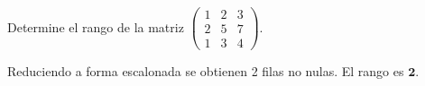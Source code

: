 \documentclass{emate-ucr}
\begin{document}
\begin{ejercicio}[10]
  Determine el rango de la matriz
  $\begin{pmatrix} 1 & 2 & 3 \\ 2 & 5 & 7 \\ 1 & 3 & 4 \end{pmatrix}$.

  \begin{solucion}
    Reduciendo a forma escalonada se obtienen 2 filas no nulas.
    El rango es $\mathbf{2}$.
  \end{solucion}
\end{ejercicio}
\end{document}
